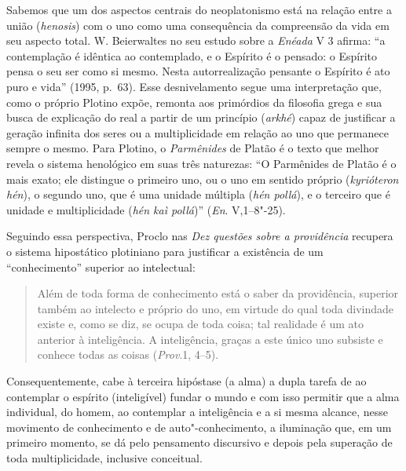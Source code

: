 Sabemos que um dos aspectos centrais do neoplatonismo está na
relação entre a união (\emph{henosis}) com o uno como uma
consequência da compreensão da vida em seu aspecto total. W.
Beierwaltes no seu estudo sobre a \emph{Enéada} V 3 afirma: ``{a
contemplação é idêntica ao contemplado, e o Espírito é o pensado: o
Espírito pensa o seu ser como si mesmo. Nesta autorrealização pensante o
Espírito é ato puro e vida}'' (1995, p.~63). Esse desnivelamento segue uma
interpretação que, como o próprio Plotino expõe, remonta aos primórdios
da filosofia grega e sua busca de explicação do real a partir de um
princípio (\emph{arkhé}) capaz de justificar a geração infinita dos
seres ou a multiplicidade em relação ao uno que permanece sempre o
mesmo. Para Plotino, o \emph{Parmênides} de Platão é o texto que
melhor revela o sistema henológico em suas três naturezas: ``O
Parmênides de Platão é o mais exato; ele distingue o primeiro uno, ou o
uno em sentido próprio (\emph{kyrióteron hén}), o segundo
uno, que é uma unidade múltipla (\emph{hén pollá}), e o
terceiro que é unidade e multiplicidade (\emph{hén kaì pollá})''
(\emph{En}. V,1--8"-25).

Seguindo essa perspectiva, Proclo nas \emph{Dez questões sobre a
providência} recupera o sistema hipostático plotiniano para justificar
a existência de um “conhecimento” superior ao intelectual:

\begin{quote}
Além de toda forma de conhecimento está o saber da providência, superior
também ao intelecto e próprio do uno, em virtude do qual toda divindade
existe e, como se diz, se ocupa de toda coisa; tal realidade é um ato
anterior à inteligência. A inteligência, graças a este único uno
subsiste e conhece todas as coisas (\emph{Prov}.1, 4--5).
\end{quote}

Consequentemente, cabe à terceira hipóstase (a alma) a dupla tarefa
de ao contemplar o espírito (inteligível) fundar o mundo e com isso
permitir que a alma individual, do homem, ao contemplar a inteligência
e a si mesma alcance, nesse movimento de conhecimento e de
auto"-conhecimento, a iluminação que, em um primeiro momento, se dá pelo
pensamento discursivo e depois pela superação de toda multiplicidade,
inclusive conceitual. 

